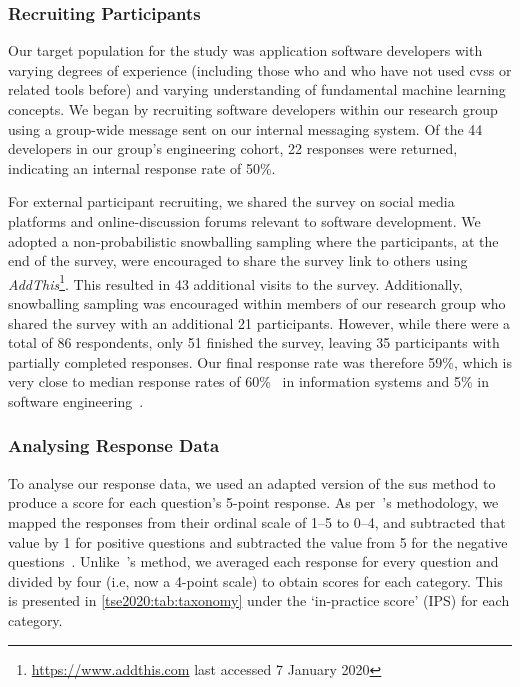 \subsubsection{Recruiting Participants}

Our target population for the study was application software developers with varying degrees of experience (including those who and who have not used \glspl{cvs} or related tools before) and varying understanding of fundamental machine learning concepts. We began by recruiting software developers within our research group using a group-wide message sent on our internal messaging system. Of the 44 developers in our group's engineering cohort, 22 responses were returned, indicating an internal response rate of 50\%.

For external participant recruiting, we shared the survey on social media platforms and online-discussion forums relevant to software development. We adopted a non-probabilistic snowballing sampling where the participants, at the end of the survey, were encouraged to share the survey link to others using \textit{AddThis}\footnote{\url{https://www.addthis.com} last accessed 7 January 2020}. This resulted in 43 additional visits to the survey. Additionally, snowballing sampling was encouraged within members of our research group who shared the survey with an additional 21 participants. However, while there were a total of 86 respondents, only 51 finished the survey, leaving 35 participants with partially completed responses. Our final response rate was therefore 59\%, which is very close to median response rates of 60\%~\citep{Baruch:1999vf} in information systems and 5\% in software engineering~\citep{Singer:2007tu}.

\subsubsection{Analysing Response Data}
\label{tse2020:sec:validation:survey:analysis}

To analyse our response data, we used an adapted version of the \gls{sus} method to produce a score for each question's 5-point response. As per~\citeauthor{Brooke:1996ua}'s methodology, we mapped the responses from their ordinal scale of 1--5 to 0--4, and subtracted that value by 1 for positive questions and subtracted the value from 5 for the negative questions~\citep{Brooke:1996ua}. Unlike~\citeauthor{Brooke:1996ua}'s method, we averaged each response for every question and divided by four (i.e, now a 4-point scale) to obtain scores for each category. This is presented in \cref{tse2020:tab:taxonomy} under the `in-practice score' (IPS) for each category.

